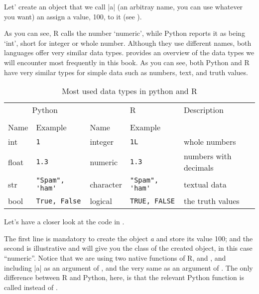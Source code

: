 Let' create an object that we call |a| (an arbitray name, you can use
whatever you want) an assign a value, 100, to it (see ).


As you can see, R calls the number `numeric', while Python reports it
as being `int', short for integer or whole number.  Although they use
different names, both languages offer very similar data types.
 provides an overview of the data types we will
encounter most frequently in this book.  As you can see,
both Python and R have very similar types for simple data such as
numbers, text, and truth values.

\newcommand{\fndouble}{In R, double and numeric can generally be used
  interchangably (there is a subtle difference, but that is not
  relevant here).}

\begin{table}
  \caption{\label{tab:types}Most used data types in python and R}{
  \begin{tabularx}{\textwidth}{lllll}
    \toprule
    \multicolumn{2}{c}{Python} & \multicolumn{2}{c}{R}& Description \\
    \cmidrule(lr){1-2}    \cmidrule(lr){3-4}\\
    Name & Example & Name & Example \\
    \midrule
    int   & \verb+1+             & integer   & \verb+1L+             & whole numbers \\
    float & \verb+1.3+           & numeric   & \verb+1.3+           & numbers with decimals \\
    str   & \verb+"Spam", 'ham'+ & character & \verb+"Spam", 'ham'+ & textual data  \\ 
    bool  & \verb+True, False+   & logical   & \verb+TRUE, FALSE+   & the truth values \\
    \bottomrule
  \end{tabularx}}{}
\end{table}
    


Let's have a closer look at the code in .

The first line is mandatory to create the object \emph{a} and store
its value 100; and the second is illustrative and will give you the
class of the created object, in this case ``numeric''. Notice that we
are using two native functions of R,  and , and
including |a| as an argument of , and the very same
 as an argument of . The only difference
between R and Python, here, is that the relevant Python function is
called  instead of .

